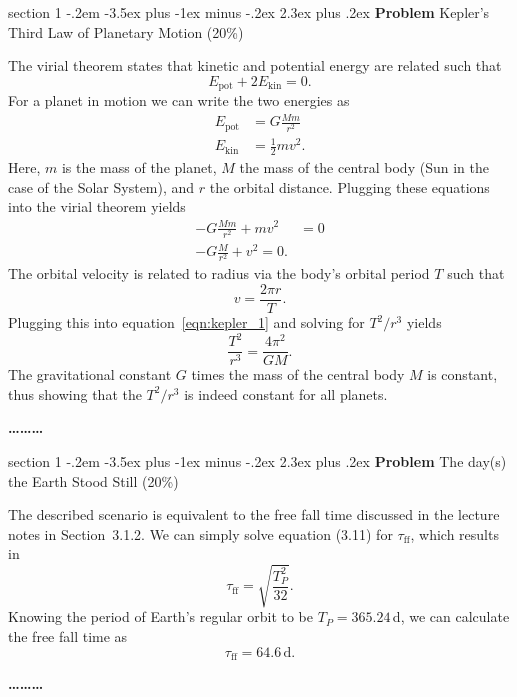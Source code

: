 \documentclass[letterpaper,12pt,twoside=false,DIV=11]{scrartcl}
\makeatletter
\newenvironment{problem}{\@startsection
    {section}
    {1}
    {-.2em}
    {-3.5ex plus -1ex minus -.2ex}
    {2.3ex plus .2ex}
    {
        \pagebreak[3] %
        \noindent\sffamily\bfseries Problem
    }
}
{
    \begin{center}\large\bfseries\ldots\ldots\ldots\end{center}
}
\makeatother
\begin{document}
\begin{problem}{Kepler's Third Law of Planetary Motion (20\%)}

    The virial theorem states that kinetic and potential energy are related such that
    \begin{equation}
        E_\mathrm{pot} + 2E_\mathrm{kin} = 0.
    \end{equation}
    For a planet in motion we can write the two energies as
    \begin{align}
        E_\mathrm{pot} &= G\frac{Mm}{r^2}\\
        E_\mathrm{kin} &= \frac{1}{2}mv^2.
    \end{align}
    Here, $m$ is the mass of the planet, $M$ the mass of the central body (Sun in the case of the Solar System), and $r$ the orbital distance. Plugging these equations into the virial theorem yields
    \begin{align}
       -G\frac{Mm}{r^2} + mv^2 &= 0 \\
       -G\frac{M}{r^2} + v^2 = 0. \label{eqn:kepler_1}
    \end{align}
    The orbital velocity is related to radius via the body's orbital period $T$ such that
    \begin{equation}
        v = \frac{2\pi r}{T}.
    \end{equation}
    Plugging this into equation~\eqref{eqn:kepler_1} and solving for $T^2/r^3$ yields
    \begin{equation}
        \frac{T^2}{r^3} = \frac{4\pi^2}{GM}.
    \end{equation}
    The gravitational constant $G$ times the mass of the central body $M$ is constant, thus showing that the $T^2/r^3$ is indeed constant for all planets.

\end{problem}


\begin{problem}{The day(s) the Earth Stood Still (20\%)}

    The described scenario is equivalent to the free fall time discussed in the lecture notes in Section~3.1.2. We can simply solve equation (3.11) for $\tau_\mathrm{ff}$, which results in
    \begin{equation}
        \tau_\mathrm{ff} = \sqrt{\frac{T_P^{2}}{32}}.
    \end{equation}
    Knowing the period of Earth's regular orbit to be $T_P = 365.24\,$d, we can calculate the free fall time as
    \begin{equation}
        \tau_\mathrm{ff} = 64.6\,\mathrm{d}.
    \end{equation}

\end{problem}
\end{document}
